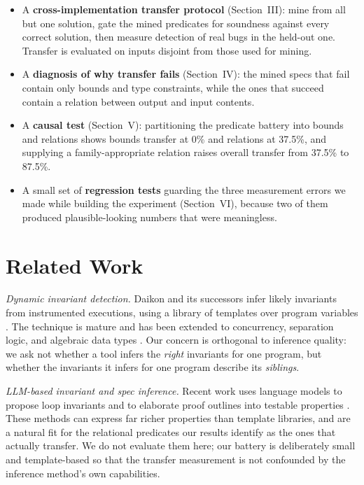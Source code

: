 \documentclass[conference]{IEEEtran}
\begin{document}
\begin{itemize}
\item A \textbf{cross-implementation transfer protocol} (Section~III): mine from all but
one solution, gate the mined predicates for soundness against every correct solution, then
measure detection of real bugs in the held-out one. Transfer is evaluated on inputs
disjoint from those used for mining.
\item A \textbf{diagnosis of why transfer fails} (Section~IV): the mined specs that fail
contain only bounds and type constraints, while the ones that succeed contain a relation
between output and input contents.
\item A \textbf{causal test} (Section~V): partitioning the predicate battery into bounds
and relations shows bounds transfer at 0\% and relations at 37.5\%, and supplying a
family-appropriate relation raises overall transfer from 37.5\% to 87.5\%.
\item A small set of \textbf{regression tests} guarding the three measurement errors we
made while building the experiment (Section~VI), because two of them produced
plausible-looking numbers that were meaningless.
\end{itemize}

\section{Related Work}

\textit{Dynamic invariant detection.} Daikon and its successors infer likely invariants
from instrumented executions, using a library of templates over program variables
\cite{ernst2007daikon}. The technique is mature and has been extended to concurrency,
separation logic, and algebraic data types \cite{syminfer,sling}. Our concern is orthogonal
to inference quality: we ask not whether a tool infers the \emph{right} invariants for one
program, but whether the invariants it infers for one program describe its \emph{siblings}.

\textit{LLM-based invariant and spec inference.} Recent work uses language models to
propose loop invariants and to elaborate proof outlines into testable properties
\cite{bali,proofoutline}. These methods can express far richer properties than template
libraries, and are a natural fit for the relational predicates our results identify as the
ones that actually transfer. We do not evaluate them here; our battery is deliberately
small and template-based so that the transfer measurement is not confounded by the
inference method's own capabilities.
\end{document}
